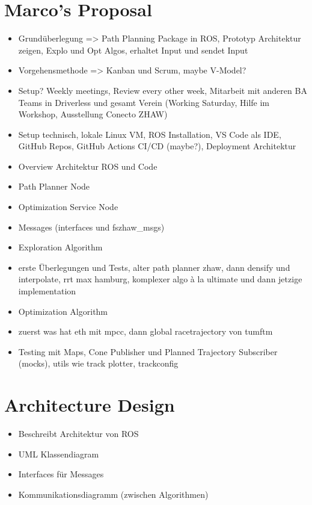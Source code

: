 \section{Marco's Proposal}
\begin{itemize}
    \item Grundüberlegung => Path Planning Package in ROS, Prototyp Architektur zeigen, Explo und Opt Algos, erhaltet Input und sendet Input
    \item Vorgehensmethode => Kanban und Scrum, maybe V-Model?
    \item Setup? Weekly meetings, Review every other week, Mitarbeit mit anderen BA Teams in Driverless und gesamt Verein (Working Saturday, Hilfe im Workshop, Ausstellung Conecto ZHAW)
    \item Setup technisch, lokale Linux VM, ROS Installation, VS Code als IDE, GitHub Repos, GitHub Actions CI/CD (maybe?), Deployment Architektur
    \item Overview Architektur ROS und Code
    \item Path Planner Node
    \item Optimization Service Node
    \item Messages (interfaces und fszhaw_msgs)
    \item Exploration Algorithm
    \item erste Überlegungen und Tests, alter path planner zhaw, dann densify und interpolate, rrt max hamburg, komplexer algo à la ultimate und dann jetzige implementation
    \item Optimization Algorithm
    \item zuerst was hat eth mit mpcc, dann global racetrajectory von tumftm
    \item Testing mit Maps, Cone Publisher und Planned Trajectory Subscriber (mocks), utils wie track plotter, trackconfig
\end{itemize}

\section{Architecture Design}
\begin{itemize}
    \item Beschreibt Architektur von ROS
    \item UML Klassendiagram
    \item Interfaces für Messages
    \item Kommunikationsdiagramm (zwischen Algorithmen)
\end{itemize}

